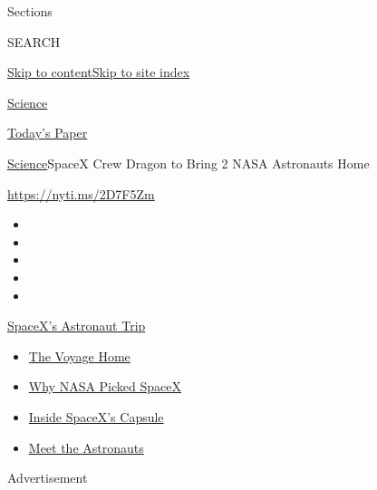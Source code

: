 Sections

SEARCH

\protect\hyperlink{site-content}{Skip to
content}\protect\hyperlink{site-index}{Skip to site index}

\href{https://www.nytimes3xbfgragh.onion/section/science}{Science}

\href{https://myaccount.nytimes3xbfgragh.onion/auth/login?response_type=cookie\&client_id=vi}{}

\href{https://www.nytimes3xbfgragh.onion/section/todayspaper}{Today's
Paper}

\href{/section/science}{Science}\textbar{}SpaceX Crew Dragon to Bring 2
NASA Astronauts Home

\url{https://nyti.ms/2D7F5Zm}

\begin{itemize}
\item
\item
\item
\item
\item
\end{itemize}

\href{https://www.nytimes3xbfgragh.onion/2020/08/01/science/nasa-spacex-astronauts.html?action=click\&pgtype=Article\&state=default\&region=TOP_BANNER\&context=storylines_menu}{SpaceX's
Astronaut Trip}

\begin{itemize}
\tightlist
\item
  \href{https://www.nytimes3xbfgragh.onion/2020/08/01/science/nasa-spacex-astronauts.html?action=click\&pgtype=Article\&state=default\&region=TOP_BANNER\&context=storylines_menu}{The
  Voyage Home}
\item
  \href{https://www.nytimes3xbfgragh.onion/2020/05/26/science/spacex-launch-nasa.html?action=click\&pgtype=Article\&state=default\&region=TOP_BANNER\&context=storylines_menu}{Why
  NASA Picked SpaceX}
\item
  \href{https://www.nytimes3xbfgragh.onion/interactive/2020/05/26/science/spacex-nasa.html?action=click\&pgtype=Article\&state=default\&region=TOP_BANNER\&context=storylines_menu}{Inside
  SpaceX's Capsule}
\item
  \href{https://www.nytimes3xbfgragh.onion/2020/05/27/science/bob-behnken-doug-hurley.html?action=click\&pgtype=Article\&state=default\&region=TOP_BANNER\&context=storylines_menu}{Meet
  the Astronauts}
\end{itemize}

Advertisement

